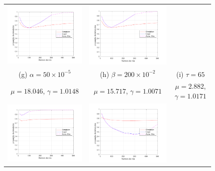 \begin{figure}
\begin{tabular}{ccc}
	        \hspace{-0.6cm}\includegraphics[width=0.35\columnwidth]{img/fig_g_2002_v0_lambda1500_mu21_4111_gamma1_014800_iter_2_rho0_0.pdf} &
	        \hspace{-0.6cm}\includegraphics[width=0.35\columnwidth]{img/fig_k_3002_v0_lambda1500_mu20_9333_gamma1_014800_iter_2_rho0_0.pdf}\\
	        (g) $\alpha = 50 \times 10^{-5}$ & 
	        (h) $\beta  = 200 \times 10^{-2}$ & 
	        (i) $\tau   = 65$\\
	        $\mu = 18.046$, $\gamma = 1.0148$ &
            $\mu = 15.717$, $\gamma = 1.0071$ &
            $\mu = 2.882$, $\gamma = 1.0171$ \\
	        \hspace{-0.6cm}\includegraphics[width=0.35\columnwidth]{img/fig_d_1003_v0_lambda1500_mu17_4592_gamma1_038300_iter_2_rho0_0.pdf} & 
	        \hspace{-0.6cm}\includegraphics[width=0.35\columnwidth]{img/fig_h_2003_v0_lambda1500_mu15_7172_gamma1_007100_iter_2_rho0_0.pdf} &

\end{tabular}
\end{figure}
